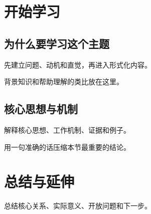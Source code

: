 \documentclass{readex-vivid}
\begin{document}
\makereadexcover
\tableofcontents

\chapter{开始学习}

\section{为什么要学习这个主题}
先建立问题、动机和直觉，再进入形式化内容。

\begin{knowledgebox}
背景知识和帮助理解的类比放在这里。
\end{knowledgebox}

\section{核心思想与机制}
解释核心思想、工作机制、证据和例子。

\begin{importantbox}
用一句准确的话压缩本节最重要的结论。
\end{importantbox}

\chapter{总结与延伸}
总结核心关系、实际意义、开放问题和下一步。
\end{document}
